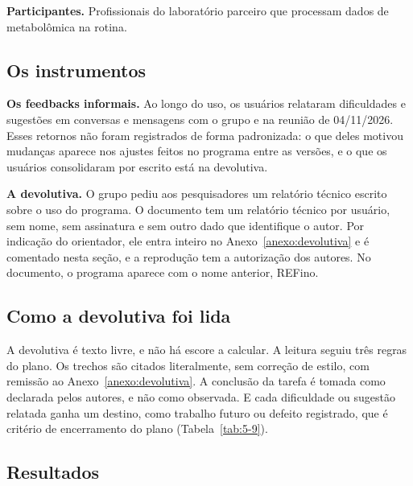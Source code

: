 \textbf{Participantes.} Profissionais do laboratório parceiro que processam dados de metabolômica na rotina.

\subsection{Os instrumentos}\label{sec:5-4-2}

\textbf{Os feedbacks informais.} Ao longo do uso, os usuários relataram dificuldades e sugestões em conversas e mensagens com o grupo e na reunião de 04/11/2026. Esses retornos não foram registrados de forma padronizada: o que deles motivou mudanças aparece nos ajustes feitos no programa entre as versões, e o que os usuários consolidaram por escrito está na devolutiva.

\textbf{A devolutiva.} O grupo pediu aos pesquisadores um relatório técnico escrito sobre o uso do programa. O documento tem um relatório técnico por usuário, sem nome, sem assinatura e sem outro dado que identifique o autor. Por indicação do orientador, ele entra inteiro no Anexo~\ref{anexo:devolutiva} e é comentado nesta seção, e a reprodução tem a autorização dos autores. No documento, o programa aparece com o nome anterior, REFino.


\subsection{Como a devolutiva foi lida}\label{sec:5-4-3}

A devolutiva é texto livre, e não há escore a calcular. A leitura seguiu três regras do plano. Os trechos são citados literalmente, sem correção de estilo, com remissão ao Anexo~\ref{anexo:devolutiva}. A conclusão da tarefa é tomada como declarada pelos autores, e não como observada. E cada dificuldade ou sugestão relatada ganha um destino, como trabalho futuro ou defeito registrado, que é critério de encerramento do plano (Tabela~\ref{tab:5-9}).

\subsection{Resultados}\label{sec:5-4-4}

